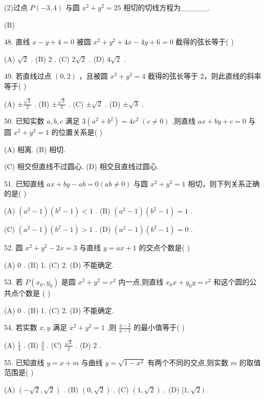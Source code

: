 \documentclass[10pt]{article}
\begin{document}
(2)过点 \(P\left( {-3,4}\right)\) 与圆 \({x}^{2} + {y}^{2} = {25}\) 相切的切线方程为\_\_\_\_\_.

(B)

48. 直线 \(x - y + 4 = 0\) 被圆 \({x}^{2} + {y}^{2} + {4x} - {4y} + 6 = 0\) 截得的弦长等于( )

(A) \(\sqrt{2}\) . (B) 2 . (C) \(2\sqrt{2}\) . (D) \(4\sqrt{2}\) .

49. 若直线过点 \(\left( {0,2}\right)\) ，且被圆 \({x}^{2} + {y}^{2} = 4\) 截得的弦长等于 2，则此直线的斜率等于( )

(A) \(\pm  \frac{\sqrt{3}}{2}\) . (B) \(\pm  \frac{\sqrt{3}}{3}\) . (C) \(\pm  \sqrt{2}\) . (D) \(\pm  \sqrt{3}\) .

50. 已知实数 \(a,b,c\) 满足 \(3\left( {{a}^{2} + {b}^{2}}\right)  = 4{c}^{2}\;\left( {c \neq  0}\right)\) ,则直线 \({ax} + {by} + c = 0\) 与圆 \({x}^{2} + {y}^{2} = 1\) 的位置关系是( )

(A) 相离. (B) 相切.

(C) 相交但直线不过圆心. (D) 相交且直线过圆心.

51. 已知直线 \({ax} + {by} - {ab} = 0\left( {{ab} \neq  0}\right)\) 与圆 \({x}^{2} + {y}^{2} = 1\) 相切，则下列关系正确的是( )

(A) \(\left( {{a}^{2} - 1}\right) \left( {{b}^{2} - 1}\right)  < 1\) . (B) \(\left( {{a}^{2} - 1}\right) \left( {{b}^{2} - 1}\right)  = 1\) .

(C) \(\left( {{a}^{2} - 1}\right) \left( {{b}^{2} - 1}\right)  > 1\) . (D) \(\left( {{a}^{2} - 1}\right) \left( {{b}^{2} - 1}\right)  = 0\) .

52. 圆 \({x}^{2} + {y}^{2} - {2x} = 3\) 与直线 \(y = {ax} + 1\) 的交点个数是( )

(A) 0 . (B) 1. (C) 2. (D) 不能确定.

53. 若 \(P\left( {{x}_{0},{y}_{0}}\right)\) 是圆 \({x}^{2} + {y}^{2} = {r}^{2}\) 内一点,则直线 \({x}_{0}x + {y}_{0}y = {r}^{2}\) 和这个圆的公共点个数是 ( )

(A) 0 . (B) 1. (C) 2. (D) 不能确定.

54. 若实数 \(x,y\) 满足 \({x}^{2} + {y}^{2} = 1\) ,则 \(\frac{y - 2}{x - 1}\) 的最小值等于( )

(A) \(\frac{1}{4}\) . (B) \(\frac{3}{4}\) . (C) \(\frac{\sqrt{3}}{2}\) . (D) 2 .

55. 已知直线 \(y = x + m\) 与曲线 \(y = \sqrt{1 - {x}^{2}}\) 有两个不同的交点,则实数 \(m\) 的取值范围是( )

(A) \(\left( {-\sqrt{2},\sqrt{2}}\right)\) . (B) \(\left( {0,\sqrt{2}}\right)\) . (C) \(\left( {1,\sqrt{2}}\right)\) . (D) \(\lbrack 1,\sqrt{2})\) .
\end{document}
